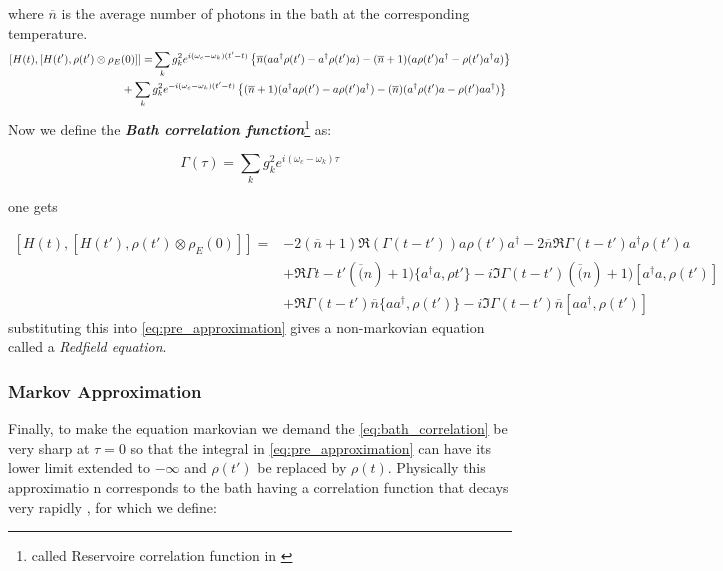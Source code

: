 where $\overline{n}$ is the average number of photons in the bath at the corresponding temperature.
\begin{equation}
\begin{split}
  [H(t), [H(t'), \rho(t')\otimes \rho_{E}(0)]] =& \sum_{k}g_{k}^{2}e^{i(\omega_{c}-\omega_{k})(t'-t)}\left\{\overline{n}(aa^{\dagger}\rho(t')-a^{\dagger}\rho(t')a) - (\overline{n}+1)(a\rho(t')a^{\dagger} - \rho(t')a^{\dagger}a) \right\}\\
  &\hspace{-1cm}+\sum_{k}g_{k}^{2}e^{-i(\omega_{c}-\omega_{k})(t'-t)}\left\{(\overline{n}+1)(a^{\dagger}a\rho(t')-a\rho(t')a^{\dagger}) - (\overline{n})(a^{\dagger}\rho(t')a - \rho(t')aa^{\dagger}) \right\}
\end{split}
\end{equation}
Now we define the \textit{\textbf{Bath correlation function}}\footnote{called Reservoire correlation function in \cite{wiseman_quantum_2010}} as:

\begin{equation}
  \Gamma(\tau) =\sum_{k}g_{k}^{2}e^{i(\omega_{c}-\omega_{k})\tau}\label{eq:bath_correlation}
\end{equation}

one gets

\begin{equation}
  \begin{split}
    [H(t), [H(t'), \rho(t')\otimes \rho_{E}(0)]] =& -2(\overline{n}+1)\Re{(\Gamma(t-t'))}a\rho(t')a^{\dagger} -2 \overline{n}\Re{\Gamma(t-t')}a^{\dagger}\rho(t')a\\
                                                  &+\Re{\Gamma{t-t'}}(\overline(n)+1)\{a^{\dagger}a, \rho{t'}\} - i\Im{\Gamma(t-t')}(\overline(n)+1)[a^{\dagger}a,\rho(t')]\\
    &+\Re{\Gamma(t-t')}\overline{n}\{aa^{\dagger}, \rho(t')\} -i \Im{\Gamma(t-t')}\overline{n}[aa^{\dagger},\rho(t')]
  \end{split}
\end{equation}
substituting this into \eqref{eq:pre_approximation} gives a non-markovian equation called a \textit{Redfield equation}.
\subsubsection{Markov Approximation}
Finally, to make the equation markovian we demand the \eqref{eq:bath_correlation} be very sharp at $\tau=0$ so that the integral in
\eqref{eq:pre_approximation} can have its lower limit extended to $-\infty$ and $\rho(t')$ be replaced by $\rho(t)$. Physically this approximatio
n corresponds to the bath having a correlation function that decays very rapidly \cite{hornberger2009introduction}, for which we define:

